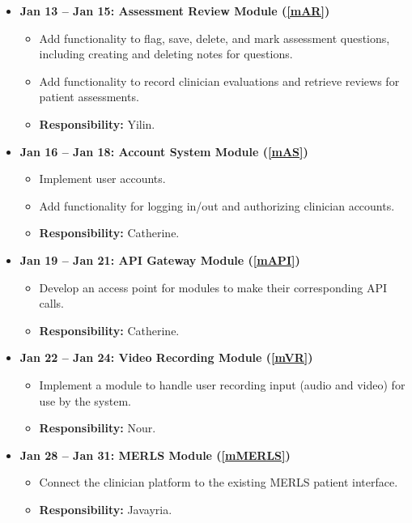 \documentclass[12pt, titlepage]{article}
\begin{document}
\begin{itemize}
    \item \textbf{Jan 13 -- Jan 15: Assessment Review Module (\ref{mAR})}
    \begin{itemize}
        \item Add functionality to flag, save, delete, and mark assessment questions, including creating and deleting notes for questions.
        \item Add functionality to record clinician evaluations and retrieve reviews for patient assessments.
        \item \textbf{Responsibility:} Yilin.
    \end{itemize}

    \item \textbf{Jan 16 -- Jan 18: Account System Module (\ref{mAS})}
    \begin{itemize}
        \item Implement user accounts.
        \item Add functionality for logging in/out and authorizing clinician accounts.
        \item \textbf{Responsibility:} Catherine.
    \end{itemize}

    \item \textbf{Jan 19 -- Jan 21: API Gateway Module (\ref{mAPI})}
    \begin{itemize}
        \item Develop an access point for modules to make their corresponding API calls.
        \item \textbf{Responsibility:} Catherine.
    \end{itemize}

    \item \textbf{Jan 22 -- Jan 24: Video Recording Module (\ref{mVR})}
    \begin{itemize}
        \item Implement a module to handle user recording input (audio and video) for use by the system.
        \item \textbf{Responsibility:} Nour.
    \end{itemize}

    \item \textbf{Jan 28 -- Jan 31: MERLS Module (\ref{mMERLS})}
    \begin{itemize}
        \item Connect the clinician platform to the existing MERLS patient interface.
        \item \textbf{Responsibility:} Javayria.
    \end{itemize}
\end{itemize}
\end{document}
